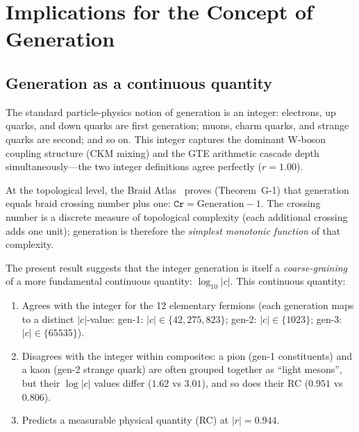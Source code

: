\documentclass[12pt,a4paper]{article}
\begin{document}
\section{Implications for the Concept of Generation}
\label{sec:generation}

\subsection{Generation as a continuous quantity}

The standard particle-physics notion of generation is an integer:
electrons, up quarks, and down quarks are first generation;
muons, charm quarks, and strange quarks are second; and so on.
This integer captures the dominant W-boson coupling structure (CKM mixing)
and the GTE arithmetic cascade depth simultaneously---the two integer
definitions agree perfectly ($r = 1.00$).

At the topological level, the Braid Atlas~\cite{SpivackBraidAtlas}
proves (Theorem~G-1) that generation equals braid crossing number plus one:
$\texttt{Cr} = \text{Generation} - 1$.
The crossing number is a discrete measure of topological complexity
(each additional crossing adds one unit); generation is therefore the
\emph{simplest monotonic function} of that complexity.

The present result suggests that the integer generation is itself a \emph{coarse-graining}
of a more fundamental continuous quantity: $\log_{10}|c|$.
This continuous quantity:

\begin{enumerate}[leftmargin=2em]
\item Agrees with the integer for the 12 elementary fermions
  (each generation maps to a distinct $|c|$-value:
  gen-1: $|c| \in \{42, 275, 823\}$;
  gen-2: $|c| \in \{1023\}$;
  gen-3: $|c| \in \{65535\}$).
\item Disagrees with the integer within composites: a pion (gen-1 constituents)
  and a kaon (gen-2 strange quark) are often grouped together as
  ``light mesons'', but their $\log|c|$ values differ ($1.62$ vs $3.01$),
  and so does their RC ($0.951$ vs $0.806$).
\item Predicts a measurable physical quantity (RC) at $|r| = 0.944$.
\end{enumerate}
\end{document}
